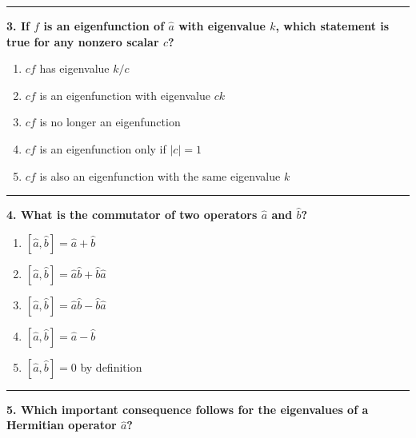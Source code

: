 \documentclass[
  english,
  9pt,
]{extbook}
\providecommand{\tightlist}{%
  \setlength{\itemsep}{0pt}\setlength{\parskip}{0pt}}
\theoremstyle{definition}
\theoremstyle{definition}
\theoremstyle{definition}
\theoremstyle{definition}
\theoremstyle{remark}
\begin{document}
\begin{center}\rule{0.5\linewidth}{0.5pt}\end{center}

\textbf{3. If \(f\) is an eigenfunction of \(\hat{a}\) with eigenvalue \(k\), which statement is true for any nonzero scalar \(c\)?}

\begin{enumerate}
\def\labelenumi{\alph{enumi}.}
\tightlist
\item
  \(c f\) has eigenvalue \(k/c\)\\
\item
  \(c f\) is an eigenfunction with eigenvalue \(ck\)\\
\item
  \(c f\) is no longer an eigenfunction\\
\item
  \(c f\) is an eigenfunction only if \(|c|=1\)\\
\item
  \(c f\) is also an eigenfunction with the same eigenvalue \(k\)
\end{enumerate}

\begin{center}\rule{0.5\linewidth}{0.5pt}\end{center}

\textbf{4. What is the commutator of two operators \(\hat{a}\) and \(\hat{b}\)?}

\begin{enumerate}
\def\labelenumi{\alph{enumi}.}
\tightlist
\item
  \([\hat{a},\hat{b}] = \hat{a} + \hat{b}\)\\
\item
  \([\hat{a},\hat{b}] = \hat{a}\hat{b} + \hat{b}\hat{a}\)\\
\item
  \([\hat{a},\hat{b}] = \hat{a}\hat{b} - \hat{b}\hat{a}\)\\
\item
  \([\hat{a},\hat{b}] = \hat{a} - \hat{b}\)\\
\item
  \([\hat{a},\hat{b}] = 0\) by definition
\end{enumerate}

\begin{center}\rule{0.5\linewidth}{0.5pt}\end{center}

\textbf{5. Which important consequence follows for the eigenvalues of a Hermitian operator \(\hat{a}\)?}
\end{document}
